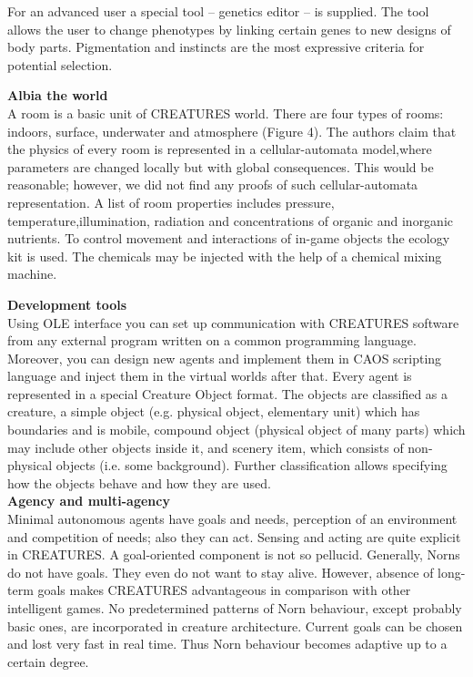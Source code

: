 \documentclass[11pt,twoside,a4paper]{article}
\begin{document}
For an advanced user a special tool -- genetics editor -- is supplied. The tool allows the user to change phenotypes by linking certain genes to new designs of body parts. Pigmentation and instincts are the most expressive criteria for potential selection.

\textbf{Albia the world}~\\
	
A room is a basic unit of CREATURES world. There are four types of rooms: indoors, surface, underwater and atmosphere (Figure 4). The authors claim that the physics of every room is represented in a cellular-automata model,where parameters are changed locally but with global consequences. This would be reasonable; however, we did not find any proofs of such cellular-automata representation. A list of room properties includes pressure, temperature,illumination, radiation and concentrations of organic and inorganic nutrients. To control movement and interactions of in-game objects the ecology kit is used. The chemicals may be injected with the help of a chemical mixing machine.

\textbf{Development tools}~\\

Using OLE interface you can set up communication with CREATURES software from any external program written on a common programming language. Moreover, you can design new agents and implement them in CAOS scripting language and inject them in the virtual worlds after that. Every agent is represented in a special Creature Object format. The objects are classified as a creature, a simple object (e.g. physical object, elementary unit) which has boundaries and is mobile, compound object (physical object of many parts) which may include other objects inside it, and scenery item, which consists of non-physical objects (i.e. some background). Further classification allows specifying how the objects behave and how they are used.~\\

\textbf{Agency and multi-agency}~\\

Minimal autonomous agents have goals and needs, perception of an environment and competition of needs; also they can act. Sensing and acting are quite explicit in CREATURES. A goal-oriented component is not so pellucid. Generally, Norns do not have goals. They even do not want to stay alive. However, absence of long-term goals makes CREATURES advantageous in comparison with other intelligent games. No predetermined patterns of Norn behaviour, except probably basic ones, are incorporated in creature architecture. Current goals can be chosen and lost very fast in real time. Thus Norn behaviour becomes adaptive up to a certain degree.~\\
\end{document}
